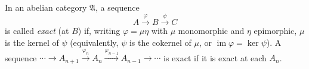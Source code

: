 In an abelian category $\mathfrak{A}$, a sequence
$$
A \xrightarrow{\varphi} B \xrightarrow{\psi} C
$$
is called \textit{exact} (at $B$) if, writing $\varphi = \mu \eta$ with $\mu$ monomorphic and $\eta$ epimorphic, $\mu$ is the kernel of $\psi$ (equivalently, $\psi$ is the cokernel of $\mu$, or $\operatorname{im} \varphi = \ker \psi$). A sequence $\cdots \to A_{n+1} \xrightarrow{\varphi_n} A_n \xrightarrow{\varphi_{n-1}} A_{n-1} \to \cdots$ is exact if it is exact at each $A_n$.
